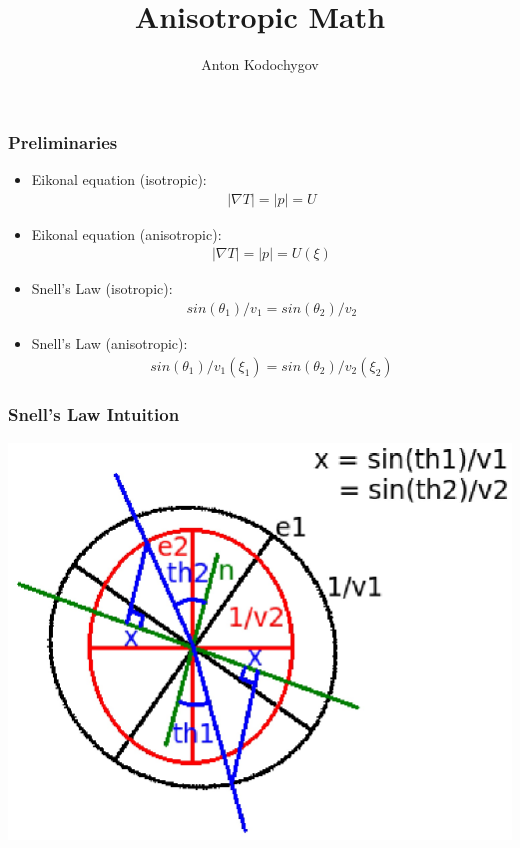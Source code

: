 \documentclass{beamer}
\begin{document}
\title {Anisotropic Math}

\author {Anton Kodochygov}

\begin{frame}
\titlepage
\end{frame}

\begin{frame}
\frametitle{Preliminaries}
\begin{itemize}

\pause \item Eikonal equation (isotropic):
\begin{eqnarray}
|\nabla T| = |p| = U \nonumber
\end{eqnarray}

\pause \item Eikonal equation (anisotropic):
\begin{eqnarray}
|\nabla T| = |p| = U(\xi) \nonumber
\end{eqnarray}

\pause \item Snell's Law (isotropic):
\begin{eqnarray}
sin(\theta_1)/v_1 = sin(\theta_2)/v_2 \nonumber
\end{eqnarray}

\pause \item Snell's Law (anisotropic):
\begin{eqnarray}
sin(\theta_1)/v_1(\xi_1) = sin(\theta_2)/v_2(\xi_2) \nonumber
\end{eqnarray}

\end{itemize}
\end{frame}

\begin{frame}
\frametitle{Snell's Law Intuition}
\includegraphics[width=\textwidth]{snell_intuition.eps}
\end{frame}
\end{document}
